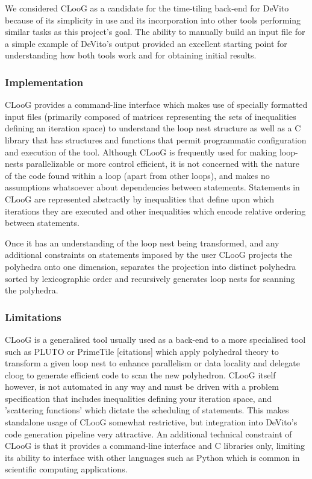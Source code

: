 \documentclass[a4paper,12pt,twoside]{report}
\begin{document}
We considered CLooG as a candidate for the time-tiling back-end for DeVito because of its simplicity in use and its incorporation into
other tools performing similar tasks as this project's goal. The ability to manually build an input file for a simple example of DeVito's
output provided an excellent starting point for understanding how both tools work and for obtaining initial results.
\subsubsection{Implementation}
CLooG provides a command-line interface which makes use of specially formatted input files (primarily composed of matrices representing
the sets of inequalities defining an iteration space) to understand the loop nest structure as well as a C library that has structures and
functions that permit programmatic configuration and execution of the tool.
Although CLooG is frequently used for making loop-nests parallelizable or more control efficient, it is not concerned with the nature of the
code found within a loop (apart from other loops), and makes no assumptions whatsoever about dependencies between statements.
Statements in CLooG are represented abstractly by inequalities that define upon which iterations they are executed and other inequalities
which encode relative ordering between statements.

Once it has an understanding of the loop nest being transformed, and any additional constraints on statements imposed by the user
CLooG projects the polyhedra onto one dimension, separates the projection into distinct polyhedra sorted by lexicographic order and 
recursively generates loop nests for scanning the polyhedra.

\subsubsection{Limitations}
CLooG is a generalised tool usually used as a back-end to a more specialised tool such as PLUTO or PrimeTile [citations] which
apply polyhedral theory to transform a given loop nest to enhance parallelism or data locality and delegate cloog to generate
efficient code to scan the new polyhedron. CLooG itself however, is not automated in any way and must be driven with a problem
specification that includes inequalities defining your iteration space, and 'scattering functions' which dictate the scheduling
of statements. This makes standalone usage of CLooG somewhat restrictive, but integration into DeVito's code generation pipeline
very attractive. An additional technical constraint of CLooG is that it provides a command-line interface and C libraries only,
limiting its ability to interface with other languages such as Python which is common in scientific computing applications.
\end{document}
